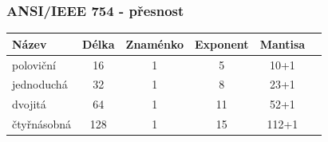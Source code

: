   \begin{frame}
    \frametitle{ANSI/IEEE 754 - přesnost}
    \boldmath
    
    \begin{center}
      \begin{tabular}{l c c c c l}
      \hline
      \textbf{Název} & \textbf{Délka} & \textbf{Znaménko} & \textbf{Exponent} & \textbf{Mantisa} \\
      \hline
      \hline
      poloviční & 16 & 1 & 5 & 10+1 \\
      \hline
      jednoduchá & 32 & 1 & 8 & 23+1 \\
      \hline
      dvojitá & 64 & 1 & 11 & 52+1 \\
      \hline
      čtyřnásobná & 128 & 1 & 15 & 112+1 \\
      \hline
      \end{tabular}
    \end{center}
   
	\end{frame}
  
